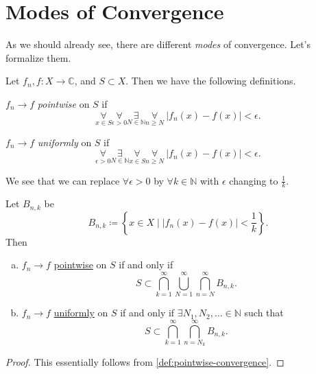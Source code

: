\section{Modes of Convergence}
As we should already see, there are different \emph{modes} of convergence. Let's formalize them.
\begin{definition*}
	Let \(f_{n}, f\colon X\to \mathbb{C}\), and \(S\subset X\). Then we have the following definitions.
	\begin{definition}\label{def:pointwise-convergence}
		\(f_{n}\to f\) \emph{pointwise} on \(S\) if
		\[
			\underset{x\in S}{\forall}\underset{\epsilon>0}{\forall} \underset{ N\in \mathbb{N}}{\exists}\underset{n\geq  N}{\forall}\ \left\vert f_{n}(x) - f(x) \right\vert < \epsilon.
		\]
	\end{definition}
	\begin{definition}\label{def:uniformly-convergence}
		\(f_{n}\to f\) \emph{uniformly} on \(S\) if
		\[
			\underset{\epsilon >0}{\forall}\underset{N\in\mathbb{N}}{\exists}\underset{x\in S}{\forall}\underset{n\geq N}{\forall}\ \left\vert f_{n}(x) - f(x) \right\vert < \epsilon.
		\]
	\end{definition}
\end{definition*}

\begin{remark}
	We see that we can replace \(\forall \epsilon > 0\) by \(\forall k\in \mathbb{N} \) with \(\epsilon \) changing to \(\frac{1}{k}\).
\end{remark}
\begin{lemma}
	Let \(B_{n, k}\) be
	\[
		B_{n, k}\coloneqq \left\{x\in X \mid \left\vert f_{n}(x) - f(x) \right\vert < \frac{1}{k}\right\}.
	\]
	Then
	\begin{enumerate}[(a)]
		\item \(f_{n}\to f\) \hyperref[def:pointwise-convergence]{pointwise} on \(S\) if and only if
		      \[
			      S\subset \bigcap_{k=1}^{\infty} \bigcup_{N=1}^{\infty} \bigcap_{n=N}^{\infty} B_{n, k}.
		      \]
		\item \(f_{n}\to f\) \hyperref[def:uniformly-convergence]{uniformly} on \(S\) if and only if \(\exists N_1, N_2, \dots \in \mathbb{N}\) such that
		      \[
			      S\subset \bigcap_{k=1}^{\infty} \bigcap_{n=N_{k}}^{\infty} B_{n, k}.
		      \]
	\end{enumerate}
\end{lemma}
\begin{proof}
	This essentially follows from \autoref{def:pointwise-convergence}.
\end{proof}

